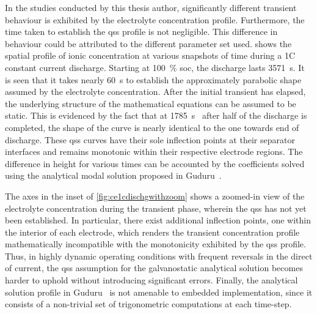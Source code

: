 In  the  studies  conducted  by  this  thesis  author,  significantly  different
transient  behaviour  is exhibited  by  the  electrolyte concentration  profile.
Furthermore,  the  time  taken  to   establish  the  \gls{qss}  profile  is  not
negligible. This  difference in behaviour  could be attributed to  the different
parameter  set used.    shows  the spatial  profile
of  ionic concentration  at  various  snapshots of  time  during  a 1C  constant
current  discharge.  Starting  at \SI{100}{\percent}  \gls{soc},  the  discharge
lasts  \SI{3571}{\second}. It  is  seen that  it  takes nearly  \SI{60}{\second}
to  establish  the approximately  parabolic  shape  assumed by  the  electrolyte
concentration. After the initial transient has elapsed, the underlying structure
of the mathematical equations can be assumed  to be static. This is evidenced by
the  fact that  at  \SI{1785}{\second} \ie~after half  of  the discharge  is
completed, the shape of the curve is  nearly identical to the one towards end of
discharge. These  \gls{qss} curves  have their sole  inflection points  at their
separator  interfaces and  remains monotonic  within their  respective electrode
regions.  The  difference in  height  for  various  times  can be  accounted  by
the  coefficients  solved  using  the  analytical  modal  solution  proposed  in
Guduru~\etal{}.

The  axes  in  the  inset  of \cref{fig:ce1cdischgwithzoom}  shows  a  zoomed-in
view  of  the electrolyte  concentration  during  the transient  phase,  wherein
the  \gls{qss}  has  not  yet  been  established.  In  particular,  there  exist
additional inflection points,  one within the interior of  each electrode, which
renders the transient concentration profile mathematically incompatible with the
monotonicity  exhibited  by  the  \gls{qss} profile.  Thus,  in  highly  dynamic
operating  conditions with  frequent reversals  in  the direct  of current,  the
\gls{qss} assumption for the galvanostatic analytical solution becomes harder to
uphold without introducing significant  errors. Finally, the analytical solution
profile in Guduru~\etal{}  is not amenable to embedded  implementation, since it
consists of a non-trivial set of trigonometric computations at each time-step.

